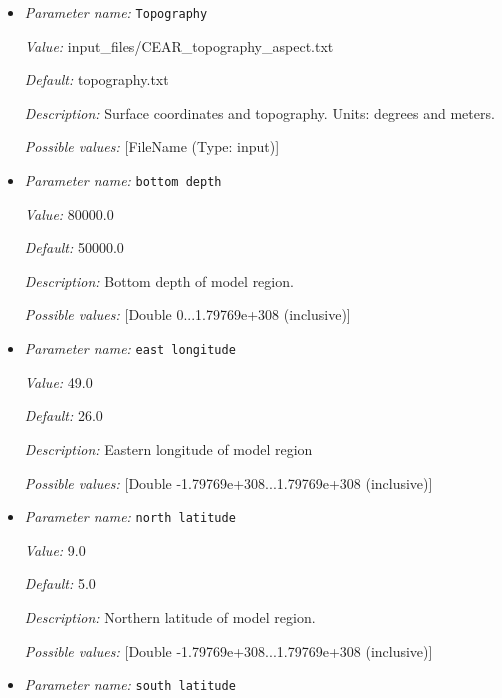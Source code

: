 \begin{itemize}
\item {\it Parameter name:} {\tt Topography}
\label{parameters:Geometry model/Africa/Topography}


{\it Value:} input_files/CEAR_topography_aspect.txt


{\it Default:} topography.txt


{\it Description:} Surface coordinates and topography. Units: degrees and meters.


{\it Possible values:} [FileName (Type: input)]
\item {\it Parameter name:} {\tt bottom depth}
\label{parameters:Geometry model/Africa/bottom depth}


{\it Value:} 80000.0


{\it Default:} 50000.0


{\it Description:} Bottom depth of model region.


{\it Possible values:} [Double 0...1.79769e+308 (inclusive)]
\item {\it Parameter name:} {\tt east longitude}
\label{parameters:Geometry model/Africa/east longitude}


{\it Value:} 49.0


{\it Default:} 26.0


{\it Description:} Eastern longitude of model region


{\it Possible values:} [Double -1.79769e+308...1.79769e+308 (inclusive)]
\item {\it Parameter name:} {\tt north latitude}
\label{parameters:Geometry model/Africa/north latitude}


{\it Value:} 9.0


{\it Default:} 5.0


{\it Description:} Northern latitude of model region.


{\it Possible values:} [Double -1.79769e+308...1.79769e+308 (inclusive)]
\item {\it Parameter name:} {\tt south latitude}
\label{parameters:Geometry model/Africa/south latitude}



\end{itemize}
